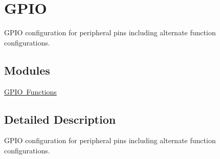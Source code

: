 \hypertarget{group___s_d___g_p_i_o}{}\section{G\+P\+IO}
\label{group___s_d___g_p_i_o}


G\+P\+IO configuration for peripheral pins including alternate function configurations.  


\subsection*{Modules}
\begin{DoxyCompactItemize}
\item 
\mbox{\hyperlink{group___s_d___g_p_i_o___functions}{G\+P\+I\+O Functions}}
\end{DoxyCompactItemize}


\subsection{Detailed Description}
G\+P\+IO configuration for peripheral pins including alternate function configurations. 

